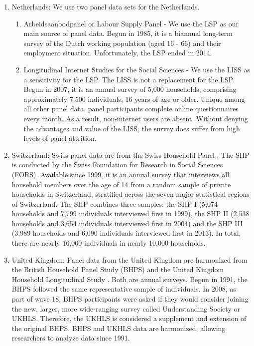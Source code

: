 \begin{enumerate}
    \item Netherlands: We use two panel data sets for the Netherlands.  
    \begin{enumerate}
        \item Arbeidsaanbodpanel or Labour Supply Panel \citep{lsp_arbeidsaanbodpanel_2016} - We use the LSP as our main source of panel data.  Begun in 1985, it is a biannual long-term survey of the Dutch working population (aged 16 - 66) and their employment situation.  Unfortunately, the LSP ended in 2014.
        \item Longitudinal Internet Studies for the Social Sciences \citep{liss_longitudinal_2020} - We use the LISS as a sensitivity for the LSP.  The LISS is not a replacement for the LSP.  Begun in 2007, it is an annual survey of 5,000 households, comprising approximately 7.500 individuals, 16 years of age or older.  Unique among all other panel data, panel participants complete online questionnaires every month.  As a result, non-internet users are absent.  Without denying the advantages and value of the LISS, the survey does suffer from high levels of panel attrition.
    \end{enumerate}

    \item Switzerland: Swiss panel data are from the Swiss Household Panel \citep{shp_swiss_2020}.  The SHP is conducted by the Swiss Foundation for Research in Social Sciences (FORS).  Available since 1999, it is an annual survey that interviews all household members over the age of 14 from a random sample of private households in Switzerland, stratified across the seven major statistical regions of Switzerland.  The SHP combines three samples: the SHP I (5,074 households and 7,799 individuals interviewed first in 1999), the SHP II (2,538 households and 3,654 individuals interviewed first in 2004) and the SHP III (3,989 households and 6,090 individuals interviewed first in 2013).  In total, there are nearly 16,000 individuals in nearly 10,000 households.  

    \item United Kingdom: Panel data from the United Kingdom are harmonized from the British Household Panel Study (BHPS) and the United Kingdom Household Longitudinal Study \citep{bhpsukhls_university_2022}.  Both are annual surveys.  Begun in 1991, the BHPS followed the same representative sample of individuals.  In 2008, as part of wave 18, BHPS participants were asked if they would consider joining the new, larger, more wide-ranging survey called Understanding Society or UKHLS.  Therefore, the UKHLS is considered a supplement and extension of the original BHPS.  BHPS and UKHLS data are harmonized, allowing researchers to analyze data since 1991.

\end{enumerate}

